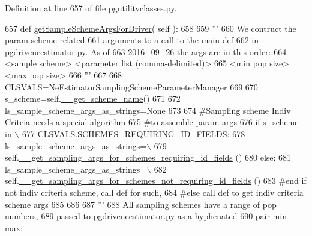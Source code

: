 Definition at line 657 of file pgutilityclasses.\+py.


\begin{DoxyCode}
657     \textcolor{keyword}{def }\hyperlink{classnegui_1_1pgutilityclasses_1_1NeEstimatorSamplingSchemeParameterManager_a227ced553bf15b1ec8df62adc9579907}{getSampleSchemeArgsForDriver}( self ):
658 
659         \textcolor{stringliteral}{'''}
660 \textcolor{stringliteral}{        We contruct the param-scheme-related}
661 \textcolor{stringliteral}{        arguments to a call to the main def}
662 \textcolor{stringliteral}{        in pgdriveneestimator.py.  As of}
663 \textcolor{stringliteral}{        2016\_09\_26 the args are in this order:}
664 \textcolor{stringliteral}{        <sample scheme> <parameter list (comma-delimited)>}
665 \textcolor{stringliteral}{        <min pop size> <max pop size>}
666 \textcolor{stringliteral}{        '''}
667 
668         CLSVALS=NeEstimatorSamplingSchemeParameterManager
669 
670         s\_scheme=self.\hyperlink{classnegui_1_1pgutilityclasses_1_1NeEstimatorSamplingSchemeParameterManager_a1fab8ff3ea6f77d959c159340822a65a}{\_\_get\_scheme\_name}()
671 
672         ls\_sample\_scheme\_args\_as\_strings=\textcolor{keywordtype}{None}
673     
674         \textcolor{comment}{#Sampling scheme Indiv Criteia needs a special algorithm }
675         \textcolor{comment}{#to assemble param args}
676         \textcolor{keywordflow}{if} s\_scheme \textcolor{keywordflow}{in} \(\backslash\)
677                 CLSVALS.SCHEMES\_REQUIRING\_ID\_FIELDS:
678             ls\_sample\_scheme\_args\_as\_strings=\(\backslash\)
679                     self.\hyperlink{classnegui_1_1pgutilityclasses_1_1NeEstimatorSamplingSchemeParameterManager_a3a63b8347c316c44fd5b593cfea90f44}{\_\_get\_sampling\_args\_for\_schemes\_requiring\_id\_fields}
      ()
680         \textcolor{keywordflow}{else}:
681             ls\_sample\_scheme\_args\_as\_strings=\(\backslash\)
682                     self.\hyperlink{classnegui_1_1pgutilityclasses_1_1NeEstimatorSamplingSchemeParameterManager_af849312115faf4cba0b4e668cb8290f3}{\_\_get\_sampling\_args\_for\_schemes\_not\_requiring\_id\_fields}
      ()
683         \textcolor{comment}{#end if not indiv criteria scheme, call def for such,}
684         \textcolor{comment}{#else call def to get indiv criteria scheme args}
685 
686 
687         \textcolor{stringliteral}{'''}
688 \textcolor{stringliteral}{        All sampling schemes have a range of pop numbers,}
689 \textcolor{stringliteral}{        passed to pgdriveneestimator.py as a hyphenated}
690 \textcolor{stringliteral}{        pair min-max:}

\end{DoxyCode}
